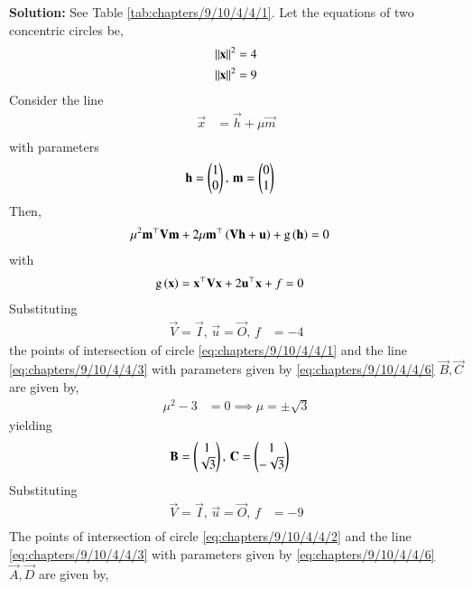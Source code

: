 \documentclass[journal,12pt,twocolumn]{IEEEtran}
\begin{document}
\begin{enumerate}
\textbf{Solution:}
\fi
See Table \ref{tab:chapters/9/10/4/4/1}.
Let the equations of two concentric circles be,
\begin{align}
\left\lVert\mathbf{x}\right\rVert^2 &= 4
\label{eq:chapters/9/10/4/4/1}\\
\left\lVert\mathbf{x}\right\rVert^2 &= 9
\label{eq:chapters/9/10/4/4/2}
\end{align}
Consider the line
		\begin{align}
\vec{x} &= \vec{h} + \mu \vec{m}
\label{eq:chapters/9/10/4/4/3}\\
\end{align}
 with parameters
\begin{align}
\mathbf{h} = \begin{pmatrix}1\\0\end{pmatrix}, \, \mathbf{m} &= \begin{pmatrix}0\\1\end{pmatrix}
\label{eq:chapters/9/10/4/4/6}
\end{align} 
Then,
\begin{align}
\mu^2\mathbf{m}^{\top}\mathbf{V}\mathbf{m} + 2 \mu\mathbf{m}^{\top}\left(\mathbf{V}\mathbf{h}+\mathbf{u}\right) 
	+ \text{g}\left(\mathbf{h}\right) &=0
\label{eq:chapters/9/10/4/4/5}
\end{align}
with
\begin{align}
\text{g}\left(\mathbf{x}\right) &= \mathbf{x}^{\top}\mathbf{V}\mathbf{x}+2\mathbf{u}^{\top}\mathbf{x}+f=0
\label{eq:chapters/9/10/4/4/4}
\end{align}
Substituting
\begin{align}
\vec{V} = \vec{I}, \, \vec{u} = \vec{O}, \, f &= -4
\end{align}
the points of intersection of circle \eqref{eq:chapters/9/10/4/4/1} and the line \eqref{eq:chapters/9/10/4/4/3} with parameters given by \eqref{eq:chapters/9/10/4/4/6} $\vec{B},\vec{C}$ are given by,
\begin{align}
\mu ^2 - 3 &= 0
\implies \mu = \pm \sqrt{3}
\end{align}
yielding
\begin{align}
\mathbf{B} = \begin{pmatrix}1\\\sqrt{3}\end{pmatrix}, \, \mathbf{C} &= \begin{pmatrix}1\\-\sqrt{3}\end{pmatrix}
\end{align}
Substituting
\begin{align}
\vec{V} = \vec{I}, \, \vec{u} = \vec{O}, \, f &= -9\\
\end{align}
The points of intersection of circle \eqref{eq:chapters/9/10/4/4/2} and the line \eqref{eq:chapters/9/10/4/4/3} with parameters given by \eqref{eq:chapters/9/10/4/4/6} $\vec{A},\vec{D}$ are given by,
\begin{align}

\end{align}
\end{enumerate}
\end{document}
